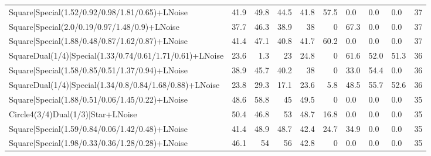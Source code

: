 \begin{tabular}{lrrrrrlllr}
 Square|Special(1.52/0.92/0.98/1.81/0.65)+LNoise                 &            41.9 &            49.8 &            44.5 &            41.8 &           57.5 & 0.0             & 0.0            & 0.0            &           37 \\
 Square|Special(2.0/0.19/0.97/1.48/0.9)+LNoise                   &            37.7 &            46.3 &            38.9 &            38   &            0   & 67.3            & 0.0            & 0.0            &           37 \\
 Square|Special(1.88/0.48/0.87/1.62/0.87)+LNoise                 &            41.4 &            47.1 &            40.8 &            41.7 &           60.2 & 0.0             & 0.0            & 0.0            &           37 \\
 SquareDual(1/4)|Special(1.33/0.74/0.61/1.71/0.61)+LNoise        &            23.6 &             1.3 &            23   &            24.8 &            0   & 61.6            & 52.0           & 51.3           &           36 \\
 Square|Special(1.58/0.85/0.51/1.37/0.94)+LNoise                 &            38.9 &            45.7 &            40.2 &            38   &            0   & 33.0            & 54.4           & 0.0            &           36 \\
 SquareDual(1/4)|Special(1.34/0.8/0.84/1.68/0.88)+LNoise         &            23.8 &            29.3 &            17.1 &            23.6 &            5.8 & 48.5            & 55.7           & 52.6           &           36 \\
 Square|Special(1.88/0.51/0.06/1.45/0.22)+LNoise                 &            48.6 &            58.8 &            45   &            49.5 &            0   & 0.0             & 0.0            & 0.0            &           35 \\
 Circle4(3/4)Dual(1/3)|Star+LNoise                               &            50.4 &            46.8 &            53   &            48.7 &           16.8 & 0.0             & 0.0            & 0.0            &           35 \\
 Square|Special(1.59/0.84/0.06/1.42/0.48)+LNoise                 &            41.4 &            48.9 &            48.7 &            42.4 &           24.7 & 34.9            & 0.0            & 0.0            &           35 \\
 Square|Special(1.98/0.33/0.36/1.28/0.28)+LNoise                 &            46.1 &            54   &            56   &            42.8 &            0   & 0.0             & 0.0            & 0.0            &           35 \\

\end{tabular}
